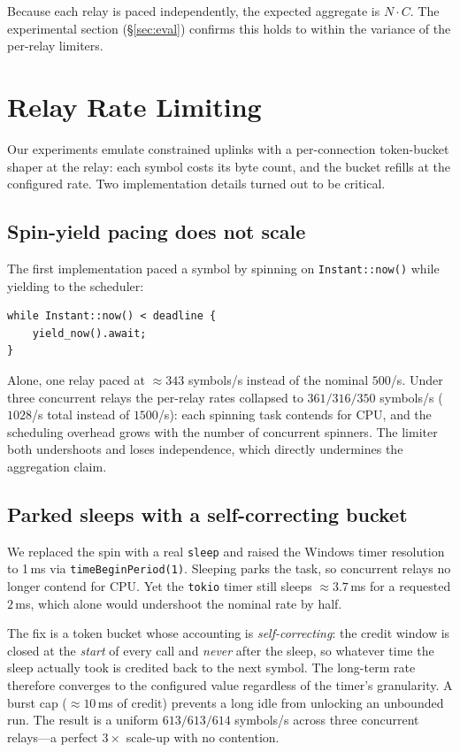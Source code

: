 \documentclass[conference]{IEEEtran}
\begin{document}
Because each relay is paced independently, the expected aggregate is $N\cdot C$.
The experimental section (\S\ref{sec:eval}) confirms this holds to within the
variance of the per-relay limiters.

\section{Relay Rate Limiting}
\label{sec:throttle}

Our experiments emulate constrained uplinks with a per-connection token-bucket
shaper at the relay: each symbol costs its byte count, and the bucket refills
at the configured rate. Two implementation details turned out to be critical.

\subsection{Spin-yield pacing does not scale}
The first implementation paced a symbol by spinning on
\texttt{Instant::now()} while yielding to the scheduler:
\begin{verbatim}
while Instant::now() < deadline {
    yield_now().await;
}
\end{verbatim}
Alone, one relay paced at $\approx 343$ symbols/s instead of the nominal
$500$/s. Under three concurrent relays the per-relay rates collapsed to
$361/316/350$ symbols/s ($1028$/s total instead of $1500$/s): each spinning task
contends for CPU, and the scheduling overhead grows with the number of
concurrent spinners. The limiter both undershoots and loses independence, which
directly undermines the aggregation claim.

\subsection{Parked sleeps with a self-correcting bucket}
We replaced the spin with a real \texttt{sleep} and raised the Windows timer
resolution to 1\,ms via \texttt{timeBeginPeriod(1)}. Sleeping parks the task,
so concurrent relays no longer contend for CPU. Yet the \texttt{tokio} timer
still sleeps $\approx 3.7$\,ms for a requested $2$\,ms, which alone would
undershoot the nominal rate by half.

The fix is a token bucket whose accounting is \emph{self-correcting}: the
credit window is closed at the \emph{start} of every call and \emph{never}
after the sleep, so whatever time the sleep actually took is credited back to
the next symbol. The long-term rate therefore converges to the configured
value regardless of the timer's granularity. A burst cap ($\approx 10$\,ms of
credit) prevents a long idle from unlocking an unbounded run. The result is a
uniform $613/613/614$ symbols/s across three concurrent relays---a perfect
$3\times$ scale-up with no contention.
\end{document}
